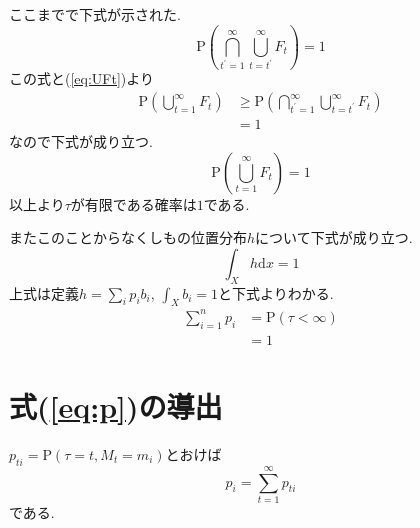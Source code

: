 ここまでで下式が示された. 
\begin{equation} \label{eq:PlimsupFt}
    \mathrm{P}\left( \bigcap_{t^{\prime}=1}^{\infty} \bigcup_{t=t^{\prime}}^{\infty} F_t \right) = 1
\end{equation}
この式と(\ref{eq:UFt})より
\begin{align}
    \mathrm{P}\left( \bigcup_{t=1}^{\infty} F_t \right) &\ge \mathrm{P}\left( \bigcap_{t^{\prime}=1}^{\infty} \bigcup_{t=t^{\prime}}^{\infty} F_t \right)\\
    &= 1
\end{align}
なので下式が成り立つ. 
\begin{equation}
    \mathrm{P}\left(\bigcup_{t=1}^{\infty} F_t \right) = 1
\end{equation}
以上より$ \tau $が有限である確率は$ 1 $である. 

またこのことからなくしもの位置分布$ h $について下式が成り立つ. 
\begin{equation}
    \int_X h \mathrm{d}x = 1
\end{equation}
上式は定義$ h = \sum_i p_i b_i $, $ \int_X b_i = 1 $と下式よりわかる. 
\begin{align}
    \sum_{i=1}^n p_i &= \mathrm{P}(\tau < \infty) \\
    &= 1
\end{align}

\section{式(\ref{eq:p})の導出} \label{sect:proof_p}
$ p_{t i} = \mathrm{P}(\tau = t , M_t = m_i) $とおけば
\begin{equation} \label{eq:p_sum_pt}
    p_i = \sum_{t=1}^{\infty}p_{t i}
\end{equation}
である. 

